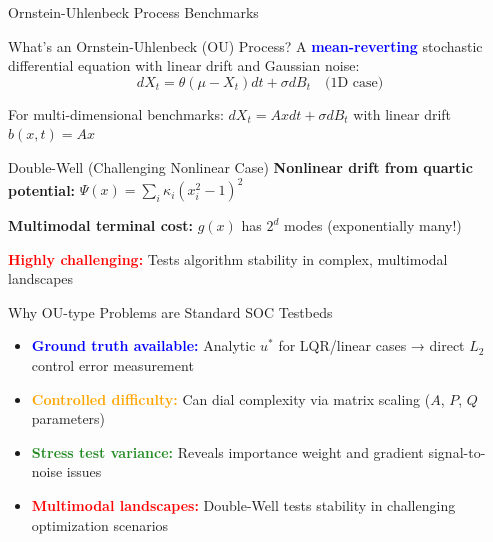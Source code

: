 \documentclass[aspectratio=169,xcolor=dvipsnames]{beamer}
\begin{document}
\begin{frame}[allowframebreaks]{Ornstein-Uhlenbeck Process Benchmarks}
    \vspace{-0.3cm}
    
    \begin{block}{What's an Ornstein-Uhlenbeck (OU) Process?}
        A \textcolor{blue}{\textbf{mean-reverting}} stochastic differential equation with linear drift and Gaussian noise:
        $$dX_t = \theta(\mu - X_t) dt + \sigma dB_t \quad \text{(1D case)}$$
        
        For multi-dimensional benchmarks: $dX_t = Ax dt + \sigma dB_t$ with linear drift $b(x,t) = Ax$
    \end{block}
    
    \vspace{0.8cm}
    
    \begin{alertblock}{Double-Well (Challenging Nonlinear Case)}
        \textbf{Nonlinear drift from quartic potential:} $\Psi(x) = \sum_i \kappa_i (x_i^2 - 1)^2$ 
        
        \textbf{Multimodal terminal cost:} $g(x)$ has $2^d$ modes (exponentially many!)
        
        \textcolor{red}{\textbf{Highly challenging:}} Tests algorithm stability in complex, multimodal landscapes
    \end{alertblock}
    
    \vspace{0.5cm}
    
    \begin{block}{Why OU-type Problems are Standard SOC Testbeds}
        \begin{itemize}
            \item \textcolor{blue}{\textbf{Ground truth available:}} Analytic $u^*$ for LQR/linear cases → direct $L_2$ control error measurement
            \item \textcolor{orange}{\textbf{Controlled difficulty:}} Can dial complexity via matrix scaling ($A$, $P$, $Q$ parameters)
            \item \textcolor{ForestGreen}{\textbf{Stress test variance:}} Reveals importance weight and gradient signal-to-noise issues
            \item \textcolor{red}{\textbf{Multimodal landscapes:}} Double-Well tests stability in challenging optimization scenarios
        \end{itemize}
    \end{block}
\end{frame}
\end{document}
